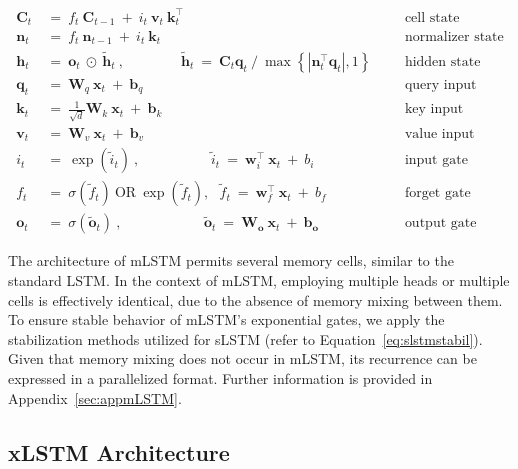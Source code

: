 \begin{align}
\label{eq:mlstm_recurrent_begin}
\mathbf{C}_t \ &= \  f_t \ \mathbf{C}_{t-1} \ + \ 
  i_t \ \mathbf{v}_t \ \mathbf{k}_t^\top & &  &\text{cell state} \\
\mathbf{n}_t \ &= \  f_t \ \mathbf{n}_{t-1} \ + \ 
  i_t \ \mathbf{k}_t & &  &\text{normalizer state} \\
\mathbf{h}_t  \ &= \ \mathbf{o}_t \ \odot \ \tilde{\mathbf{h}}_t
\ , \qquad \qquad 
\tilde{\mathbf{h}}_t \ = \   \mathbf{C}_t \mathbf{q}_t \ / \ 
  \max \left\{ |\mathbf{n}_t^\top \mathbf{q}_t|, 1 \right\} 
   &&&\text{hidden state} \\
\mathbf{q}_t \ &= \ \mathbf{W}_q \ \mathbf{x}_t \ + \ \mathbf{b}_q  & &  &\text{query input} \\
\mathbf{k}_t \ &= \ \frac{1}{\sqrt{d}} \mathbf{W}_k \ \mathbf{x}_t \ + \ \mathbf{b}_k  & &  &\text{key input} \\
\mathbf{v}_t \ &= \ \mathbf{W}_v \ \mathbf{x}_t \ + \ \mathbf{b}_v  & &  &\text{value input} \\
i_t \ &= \ \!\exp \!  \! \left( \tilde{i}_t  \right) \ , 
 \qquad \qquad \ \ \ \ \,
  \tilde{i}_t \ = \ \mathbf{w}^\top_{i} \ \mathbf{x}_t \ + \  b_{i} \ \ \ 
  &&&\text{input gate} \\
f_t \ &= \ \sigma \!  \left(  \tilde{f}_t \right) \ \text{OR} \ \!\exp \!  \! \left(  \tilde{f}_t \right) , \ \ \: \!
\tilde{f}_t \ = \ \mathbf{w}^\top_{f} \ \mathbf{x}_t  \ + \
  b_{f}
  &&& \text{forget gate} \\
\label{eq:mlstm_recurrent_end}
\mathbf{o}_t \ &= \ \sigma \left( \tilde{\mathbf{o}}_t \right) \ , \qquad \qquad \quad \ \ \ \,
  \tilde{\mathbf{o}}_t  \ = \ \mathbf{W}_{\mathbf{o}} \ \mathbf{x}_t \ + \
  \mathbf{b}_{\mathbf{o}}
  &&&\text{output gate} 
\end{align}

The architecture of mLSTM permits several memory cells, similar to the standard LSTM. In the context of mLSTM, employing multiple heads or multiple cells is effectively identical, due to the absence of memory mixing between them. To ensure stable behavior of mLSTM's exponential gates, we apply the stabilization methods utilized for sLSTM (refer to Equation~\ref{eq:slstmstabil}). Given that memory mixing does not occur in mLSTM, its recurrence can be expressed in a parallelized format. Further information is provided in Appendix~\ref{sec:appmLSTM}.

\subsection{xLSTM Architecture}
\label{sec:xLSTMarch}

